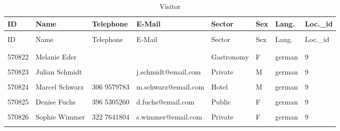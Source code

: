 \documentclass[letterpaper,12pt]{article}
\begin{document}
\begingroup
\renewcommand\arraystretch{0.5}
\begin{longtable}{p{1.3cm}p{1.6cm}p{1.8cm}p{3.6cm}p{2cm}p{.7cm}p{1.2cm}p{1.4cm}}
        \caption{Visitor} \\
        ID & Name & Telephone & E-Mail & Sector & Sex & Lang. & Loc.\_id \\
        \endfirsthead \\
        ID & Name & Telephone & E-Mail & Sector & Sex & Lang. & Loc.\_id \\
        \endhead \\
        \hline \\
        \color{red} 570822 & Melanie Eder &  &  & \color{red} Gastronomy & F & german & 9 \\
        \hline \\
        570823 & Julian Schmidt &  & j.schmidt@email.com & \color{red} Private & M & german & 9 \\
        \hline \\
        570824 & Marcel Schwarz & 306 9579783 & m.schwarz@email.com & \color{red} Hotel & M & german & 9 \\
        \hline \\
        570825 & Denise Fuchs & 396 5305260 & d.fuchs@email.com & \color{red} Public & F & german & 9 \\
        \hline \\
        570826 & Sophie Wimmer & 322 7641804 & s.wimmer@email.com & \color{red} Private & F & german & 9 \\
        \hline \\
\end{longtable} 
\endgroup
\end{document}
